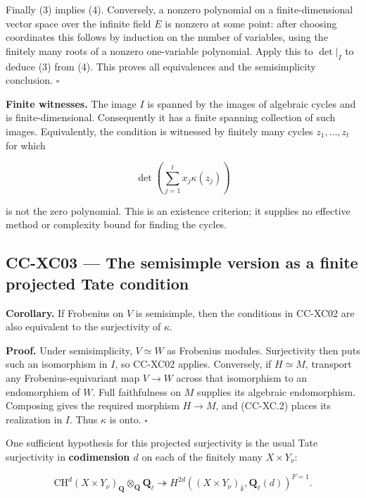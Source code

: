 Finally (3) implies (4). Conversely, a nonzero polynomial on a
finite-dimensional vector space over the infinite field \(E\) is nonzero
at some point: after choosing coordinates this follows by induction on
the number of variables, using the finitely many roots of a nonzero
one-variable polynomial. Apply this to \(\det|_I\) to deduce (3) from
(4). This proves all equivalences and the semisimplicity conclusion.
\(\square\)

\textbf{Finite witnesses.} The image \(I\) is spanned by the images of
algebraic cycles and is finite-dimensional. Consequently it has a finite
spanning collection of such images. Equivalently, the condition is
witnessed by finitely many cycles \(z_1,\ldots,z_t\) for which

\[
 \det\!\left(\sum_{j=1}^t x_j\kappa(z_j)\right)
\]

is not the zero polynomial. This is an existence criterion; it supplies
no effective method or complexity bound for finding the cycles.

\subsection{CC-XC03 --- The semisimple version as a finite projected
Tate
condition}\label{cc-xc03-the-semisimple-version-as-a-finite-projected-tate-condition}

\textbf{Corollary.} If Frobenius on \(V\) is semisimple, then the
conditions in CC-XC02 are also equivalent to the surjectivity of
\(\kappa\).

\textbf{Proof.} Under semisimplicity, \(V\simeq W\) as Frobenius
modules. Surjectivity then puts such an isomorphism in \(I\), so CC-XC02
applies. Conversely, if \(H\simeq M\), transport any
Frobenius-equivariant map \(V\to W\) across that isomorphism to an
endomorphism of \(W\). Full faithfulness on \(M\) supplies its algebraic
endomorphism. Composing gives the required morphism \(H\to M\), and
(CC-XC.2) places its realization in \(I\). Thus \(\kappa\) is onto.
\(\square\)

One sufficient hypothesis for this projected surjectivity is the usual
Tate surjectivity in \textbf{codimension \(d\)} on each of the finitely
many \(X\times Y_\nu\):

\[
 \mathrm{CH}^d(X\times Y_\nu)_{\mathbf Q}
       \otimes_{\mathbf Q}\mathbf Q_\ell
 \twoheadrightarrow
 H^{2d}((X\times Y_\nu)_{\bar k},\mathbf Q_\ell(d))^{F=1}.
                                                        \tag{CC-XC.5}
\]

